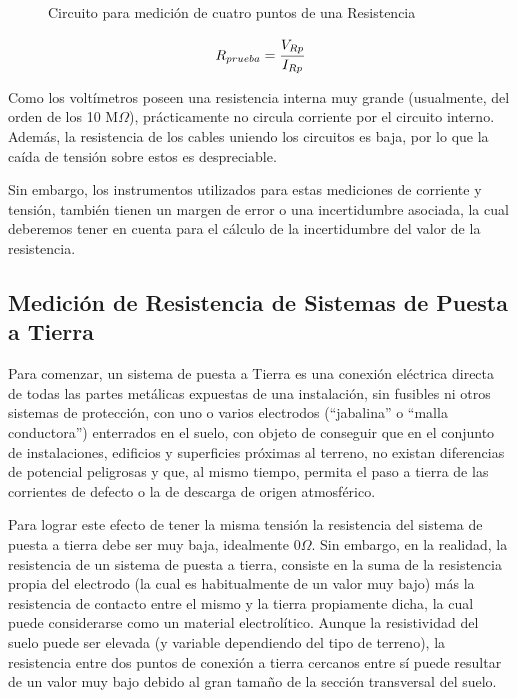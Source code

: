\begin{figure}[h!]
        \centering        
       
        \caption{Circuito para medición de cuatro puntos de una Resistencia}
        \label{fig:ej4puntas}
\end{figure}

\begin{equation}
    R_{prueba}= \cfrac{V_{Rp}}{I_{Rp}}
\end{equation}

Como los voltímetros poseen una resistencia interna muy grande (usualmente, del orden de los 10 M$\Omega$), prácticamente no circula corriente por el circuito interno. Además, la resistencia de los cables uniendo los circuitos es baja, por lo que la caída de tensión sobre estos es despreciable.

Sin embargo, los instrumentos utilizados para estas mediciones de corriente y tensión, también tienen un margen de error o una incertidumbre asociada, la cual deberemos tener en cuenta para el cálculo de la incertidumbre del valor de la resistencia.



\subsection{Medición de Resistencia de Sistemas de Puesta a Tierra}
\label{sec:MTmrspt}


Para comenzar, un sistema de puesta a Tierra es una conexión eléctrica directa de todas las partes metálicas expuestas de una instalación, sin fusibles ni otros sistemas de protección, con uno o varios electrodos (“jabalina” o “malla conductora”) enterrados en el suelo, con objeto de conseguir que en el conjunto de instalaciones, edificios y superficies próximas al terreno, no existan diferencias de potencial peligrosas y que, al mismo tiempo, permita el paso a tierra de las corrientes de defecto o la de descarga de origen atmosférico.

Para lograr este efecto de tener la misma tensión la resistencia del sistema de puesta a tierra debe ser muy baja, idealmente 0$\Omega$. Sin embargo, en la realidad, la resistencia de un sistema de puesta a tierra, consiste en la suma de la resistencia propia del electrodo (la cual es habitualmente de un valor muy bajo) más la resistencia de contacto entre el mismo y la tierra propiamente dicha, la cual puede considerarse como un material electrolítico. Aunque la resistividad del suelo puede ser elevada (y variable dependiendo del tipo de terreno), la resistencia entre dos puntos de conexión a tierra cercanos entre sí puede resultar de un valor muy bajo debido al gran tamaño de la sección transversal del suelo. 

